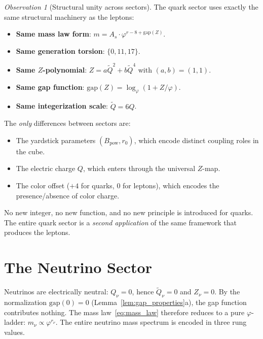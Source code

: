 \documentclass[11pt,a4paper]{article}
\theoremstyle{definition}
\theoremstyle{remark}
\newtheorem{observation}[theorem]{Observation}
\newcommand{\phig}{\varphi}
\newcommand{\tildeQ}{\tilde{Q}}
\newcommand{\Zidx}{Z}
\begin{document}
\begin{observation}[Structural unity across sectors]
\label{obs:structural_unity}
The quark sector uses exactly the same structural machinery as the leptons:
\begin{itemize}[nosep]
  \item \textbf{Same mass law form}: $m = A_s \cdot \phig^{r-8+\mathrm{gap}(Z)}$.
  \item \textbf{Same generation torsion}: $\{0, 11, 17\}$.
  \item \textbf{Same $\Zidx$-polynomial}: $\Zidx = a\tildeQ^2 + b\tildeQ^4$
        with $(a,b) = (1,1)$.
  \item \textbf{Same gap function}: $\mathrm{gap}(\Zidx) =
        \log_\phig(1 + \Zidx/\phig)$.
  \item \textbf{Same integerization scale}: $\tildeQ = 6Q$.
\end{itemize}
The \emph{only} differences between sectors are:
\begin{itemize}[nosep]
  \item The yardstick parameters $(B_{\mathrm{pow}}, r_0)$, which encode
        distinct coupling roles in the cube.
  \item The electric charge $Q$, which enters through the universal
        $\Zidx$-map.
  \item The color offset ($+4$ for quarks, $0$ for leptons), which encodes
        the presence/absence of color charge.
\end{itemize}
No new integer, no new function, and no new principle is introduced for quarks.
The entire quark sector is a \emph{second application} of the same framework
that produces the leptons.
\end{observation}


\section{The Neutrino Sector}
\label{sec:neutrinos}

Neutrinos are electrically neutral: $Q_\nu = 0$, hence $\tildeQ_\nu = 0$ and
$\Zidx_\nu = 0$.  By the normalization $\mathrm{gap}(0) = 0$
(Lemma~\ref{lem:gap_properties}a), the gap function contributes nothing.
The mass law~\eqref{eq:mass_law} therefore reduces to a pure $\phig$-ladder:
$m_\nu \propto \phig^{r_\nu}$.  The entire neutrino mass spectrum is encoded
in three rung values.
\end{document}
